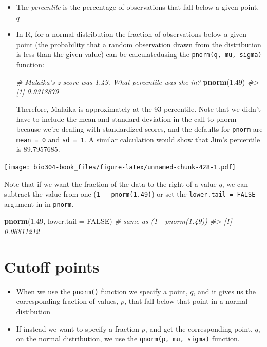 \documentclass[]{book}
\newenvironment{Shaded}{\begin{snugshade}}{\end{snugshade}}
\newcommand{\CommentTok}[1]{\textcolor[rgb]{0.56,0.35,0.01}{\textit{#1}}}
\newcommand{\DataTypeTok}[1]{\textcolor[rgb]{0.13,0.29,0.53}{#1}}
\newcommand{\FloatTok}[1]{\textcolor[rgb]{0.00,0.00,0.81}{#1}}
\newcommand{\KeywordTok}[1]{\textcolor[rgb]{0.13,0.29,0.53}{\textbf{#1}}}
\newcommand{\NormalTok}[1]{#1}
\newcommand{\OtherTok}[1]{\textcolor[rgb]{0.56,0.35,0.01}{#1}}
\theoremstyle{definition}
\theoremstyle{definition}
\theoremstyle{definition}
\theoremstyle{remark}
\begin{document}
\begin{itemize}
\item
  The \emph{percentile} is the percentage of observations that fall
  below a given point, \(q\)
\item
  In R, for a normal distribution the fraction of observations below a
  given point (the probability that a random observation drawn from the
  distribution is less than the given value) can be calculatedusing the
  \texttt{pnorm(q,\ mu,\ sigma)} function:

\begin{Shaded}
\begin{Highlighting}[]
\CommentTok{# Malaika's z-score was 1.49. What percentile was she in?}
\KeywordTok{pnorm}\NormalTok{(}\FloatTok{1.49}\NormalTok{) }
\CommentTok{#> [1] 0.9318879}
\end{Highlighting}
\end{Shaded}

  Therefore, Malaika is approximately at the 93-percentile. Note that we
  didn't have to include the mean and standard deviation in the call to
  pnorm because we're dealing with standardized scores, and the defaults
  for \texttt{pnorm} are \texttt{mean\ =\ 0} and \texttt{sd\ =\ 1}. A
  similar calculation would show that Jim's percentile is 89.7957685.
\end{itemize}

\texttt{[image: bio304-book\_files/figure-latex/unnamed-chunk-428-1.pdf]}

Note that if we want the fraction of the data to the right of a value
\(q\), we can subtract the value from one (\texttt{1\ -\ pnorm(1.49)})
or set the \texttt{lower.tail\ =\ FALSE} argument in in \texttt{pnorm}.

\begin{Shaded}
\begin{Highlighting}[]
\KeywordTok{pnorm}\NormalTok{(}\FloatTok{1.49}\NormalTok{, }\DataTypeTok{lower.tail =} \OtherTok{FALSE}\NormalTok{) }\CommentTok{# same as (1 - pnorm(1.49))}
\CommentTok{#> [1] 0.06811212}
\end{Highlighting}
\end{Shaded}

\hypertarget{cutoff-points}{%
\section{Cutoff points}\label{cutoff-points}}

\begin{itemize}
\item
  When we use the \texttt{pnorm()} function we specify a point, \(q\),
  and it gives us the corresponding fraction of values, \(p\), that fall
  below that point in a normal distibution
\item
  If instead we want to specify a fraction \(p\), and get the
  corresponding point, \(q\), on the normal distribution, we use the
  \texttt{qnorm(p,\ mu,\ sigma)} function.
\end{itemize}
\end{document}
